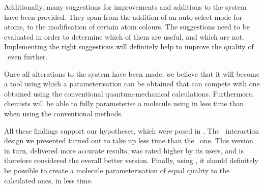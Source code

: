 Additionally, many suggestions for improvements and additions to the system have been provided. They span from the addition of an auto-select mode for atoms, to the modification of certain atom colours. The suggestions need to be evaluated in order to determine which of them are useful, and which are not. Implementing the right suggestions will definitely help to improve the quality of \oframp\ even further.

Once all alterations to the system have been made, we believe that it will become a tool using which a parameterisation can be obtained that can compete with one obtained using the conventional quantum-mechanical calculations. Furthermore, chemists will be able to fully parameterise a molecule using \oframp{} in less time than when using the conventional methods.

All these findings support our hypotheses, which were posed in . The \IDb\ interaction design we presented turned out to take up less time than the \IDa\ one. This version in turn, delivered more accurate results, was rated higher by its users, and is therefore considered the overall better version. Finally, using \oframp, it should definitely be possible to create a molecule parameterisation of equal quality to the calculated ones, in less time.
